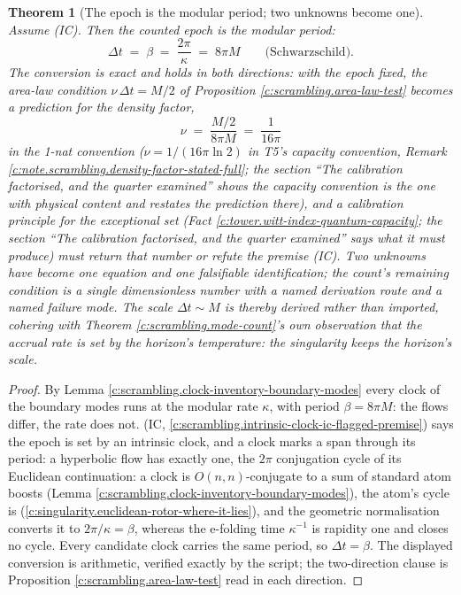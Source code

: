 \documentclass[11pt]{article}
\newtheorem{theorem}{Theorem}[section]
\theoremstyle{definition}
\theoremstyle{plain}
\begin{document}
\begin{theorem}[The epoch is the modular period; two unknowns become one]\label{c:scrambling.epoch-modular-period-two-unknowns-become}
Assume (IC). Then the counted epoch is the modular period:
\[
\Delta t \;=\; \beta \;=\; \frac{2\pi}{\kappa} \;=\; 8\pi M \qquad \text{(Schwarzschild)}.
\]
The conversion is exact and holds in both directions: with the epoch fixed, the area-law condition $\nu\,\Delta t = M/2$ of Proposition \ref{c:scrambling.area-law-test} becomes a prediction for the density factor,
\[
\nu \;=\; \frac{M/2}{8\pi M} \;=\; \frac{1}{16\pi}
\]
in the 1-nat convention ($\nu = 1/(16\pi\ln 2)$ in T5's capacity convention, Remark \ref{c:note.scrambling.density-factor-stated-full}; the section ``The calibration factorised, and the quarter examined'' shows the capacity convention is the one with physical content and restates the prediction there), and a calibration principle for the exceptional set (Fact \ref{c:tower.witt-index-quantum-capacity}; the section ``The calibration factorised, and the quarter examined'' says what it must produce) must return that number \emph{or refute the premise (IC)}. Two unknowns have become one equation and one falsifiable identification; the count's remaining condition is a single dimensionless number with a named derivation route and a named failure mode. The scale $\Delta t \sim M$ is thereby derived rather than imported, cohering with Theorem \ref{c:scrambling.mode-count}'s own observation that the accrual rate is set by the horizon's temperature: the singularity keeps the horizon's scale.
\end{theorem}
\begin{proof}
By Lemma \ref{c:scrambling.clock-inventory-boundary-modes} every clock of the boundary modes runs at the modular rate $\kappa$, with period $\beta = 8\pi M$: the flows differ, the rate does not. (IC, \ref{c:scrambling.intrinsic-clock-ic-flagged-premise}) says the epoch is set by an intrinsic clock, and a clock marks a span through its period: a hyperbolic flow has exactly one, the $2\pi$ conjugation cycle of its Euclidean continuation: a clock is $O(n,n)$-conjugate to a sum of standard atom boosts (Lemma \ref{c:scrambling.clock-inventory-boundary-modes}), the atom's cycle is \cite[Prop.~7.21(1)]{ButlerT5} (\ref{c:singularity.euclidean-rotor-where-it-lies}), and the geometric normalisation converts it to $2\pi/\kappa = \beta$, whereas the e-folding time $\kappa^{-1}$ is rapidity one and closes no cycle. Every candidate clock carries the same period, so $\Delta t = \beta$. The displayed conversion is arithmetic, verified exactly by the script; the two-direction clause is Proposition \ref{c:scrambling.area-law-test} read in each direction.

\end{proof}
\end{document}
